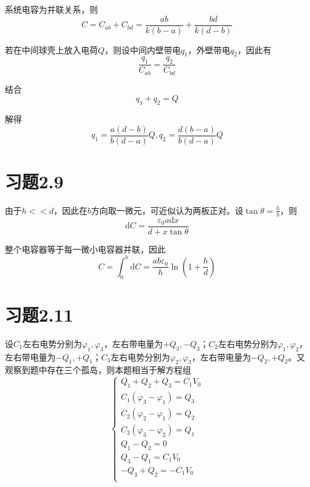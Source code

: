 \documentclass{SCIS2020cn}
\begin{document}
系统电容为并联关系，则
\begin{equation}
    C=C_{ab}+C_{bd}=\frac{ab}{k(b-a)}+\frac{bd}{k(d-b)}
\end{equation}

若在中间球壳上放入电荷$Q$，则设中间内壁带电$q_1$，外壁带电$q_2$，因此有
\begin{equation}
    \frac{q_1}{C_{ab}}=\frac{q_2}{C_{bd}}
\end{equation}

结合
\begin{equation}
    q_1+q_2=Q
\end{equation}

解得
\begin{equation}
    q_1=\frac{a(d-b)}{b(d-a)}Q, q_2=\frac{d(b-a)}{b(d-a)}Q
\end{equation}

\section{习题2.9}
由于$h<<d$，因此在$b$方向取一微元，可近似认为两板正对。设$\displaystyle\tan\theta=\frac{h}{b}$，则
\begin{equation}
    \text{d}C=\frac{\varepsilon_0a\text{d}x}{d+x\tan\theta}
\end{equation}

整个电容器等于每一微小电容器并联，因此
\begin{equation}
    C=\int_0^b\text{d}C=\frac{ab\varepsilon_0}{h}\ln\left(1+\frac{h}{d}\right)
\end{equation}

\section{习题2.11}
设$C_1$左右电势分别为$\varphi_1,\varphi_3$，左右带电量为$+Q_3,-Q_3$；$C_2$左右电势分别为$\varphi_1,\varphi_2$，左右带电量为$-Q_1,+Q_1$；$C_3$左右电势分别为$\varphi_2,\varphi_3$，左右带电量为$-Q_2,+Q_2$。又观察到题中存在三个孤岛，则本题相当于解方程组
$$\begin{cases}
    Q_1+Q_2+Q_3=C_1V_0\\
    C_1(\varphi_3-\varphi_1)=Q_3\\
    C_2(\varphi_2-\varphi_1)=Q_2\\
    C_3(\varphi_3-\varphi_2)=Q_1\\
    Q_1-Q_2=0\\
    Q_3-Q_1=C_1V_0\\
    -Q_3+Q_2=-C_1V_0\\
\end{cases}$$
\end{document}
